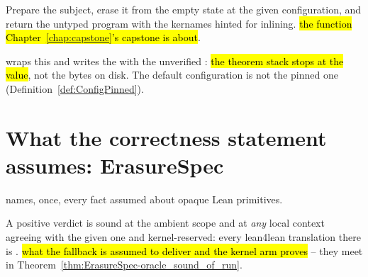 \begin{definition}
\label{def:Erasure-erase}
\leanok
{} Prepare the subject, erase it from the empty state at the given configuration, and
return the untyped \lbox{} program with the kernames hinted for inlining.
 \hl{the function Chapter~\ref{chap:capstone}'s capstone is about}.
\end{definition}

\begin{remark}
  wraps this and writes the  with the unverified
: \hl{the theorem stack stops at the  value}, not the bytes on
disk. The default configuration is not the pinned one (Definition~\ref{def:ConfigPinned}).
\end{remark}

\section{What the correctness statement assumes: ErasureSpec}
\label{sec:eraser:spec}
 names, once, every fact assumed about opaque Lean primitives.

\begin{definition}
\label{def:Oracle-MetaSound}
\leanok
{} A positive verdict is sound at the ambient scope and at \emph{any} local context
agreeing with the given one and kernel-reserved: every lean4lean translation there is \Erasable{}.
 \hl{what the fallback is assumed to deliver and the kernel arm proves} -- they meet in
Theorem~\ref{thm:ErasureSpec-oracle_sound_of_run}.
\end{definition}


